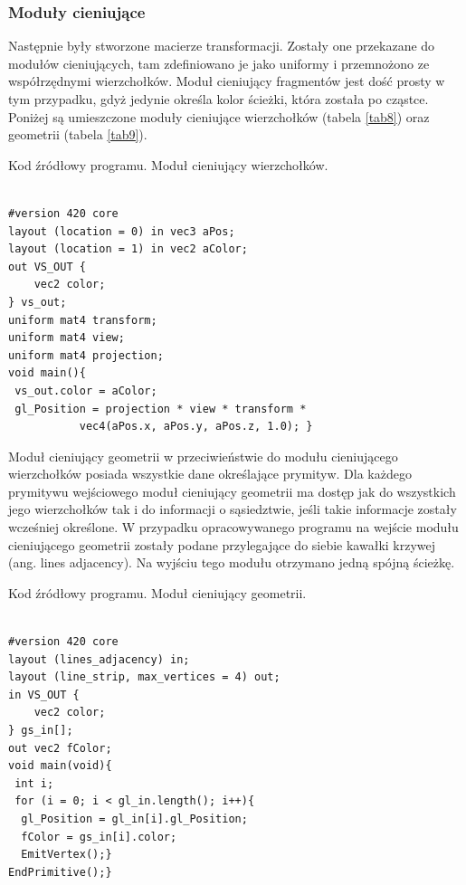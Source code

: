 \subsubsection{Moduły cieniujące}
Następnie były stworzone macierze transformacji. Zostały one przekazane do modułów cieniujących, tam zdefiniowano je jako uniformy i przemnożono ze współrzędnymi wierzchołków. Moduł cieniujący fragmentów jest dość prosty w tym przypadku, gdyż jedynie określa kolor ścieżki, która została po cząstce. Poniżej są umieszczone moduły cieniujące wierzchołków (tabela \ref{tab8}) oraz geometrii (tabela \ref{tab9}).
\begin{table}[H]
\caption{Kod źródłowy programu. Moduł cieniujący wierzchołków.}
\label{tab8}
\begin{lstlisting}[frame=single]  % Start your code-block

#version 420 core
layout (location = 0) in vec3 aPos;
layout (location = 1) in vec2 aColor;
out VS_OUT {
    vec2 color;
} vs_out;
uniform mat4 transform;
uniform mat4 view;
uniform mat4 projection;
void main(){
 vs_out.color = aColor;
 gl_Position = projection * view * transform * 
           vec4(aPos.x, aPos.y, aPos.z, 1.0); }
\end{lstlisting}
\end{table}

Moduł cieniujący geometrii w przeciwieństwie do modułu cieniującego wierzchołków posiada wszystkie dane określające prymityw. Dla każdego prymitywu wejściowego moduł cieniujący geometrii ma dostęp jak do wszystkich jego wierzchołków tak i do informacji o sąsiedztwie, jeśli takie informacje zostały wcześniej określone. W przypadku opracowywanego programu na wejście modułu cieniującego geometrii zostały podane przylegające do siebie kawałki krzywej (ang. lines adjacency). Na wyjściu tego modułu otrzymano jedną spójną ścieżkę.

\begin{table}[H]
\caption{Kod źródłowy programu. Moduł cieniujący geometrii.}
\label{tab9}
\begin{lstlisting}[frame=single]  % Start your code-block

#version 420 core
layout (lines_adjacency) in;
layout (line_strip, max_vertices = 4) out;
in VS_OUT {
    vec2 color;
} gs_in[];
out vec2 fColor;
void main(void){
 int i;
 for (i = 0; i < gl_in.length(); i++){
  gl_Position = gl_in[i].gl_Position;
  fColor = gs_in[i].color;
  EmitVertex();}
EndPrimitive();}
\end{lstlisting}
\end{table}

